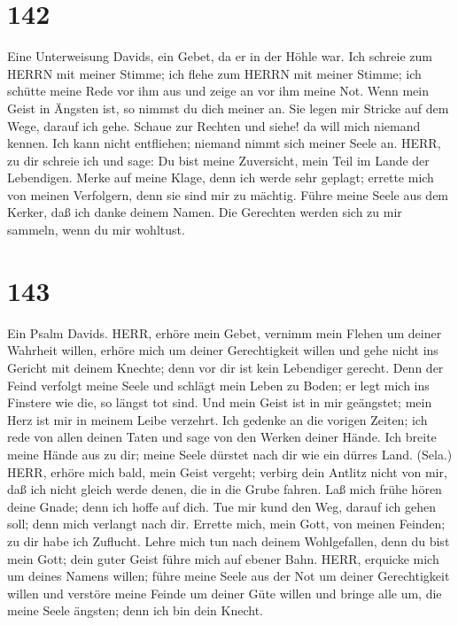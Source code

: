 \hypertarget{section-141}{%
\section{142}\label{section-141}}

 Eine Unterweisung Davids, ein Gebet, da er in der Höhle
war. Ich schreie zum HERRN mit meiner Stimme; ich flehe zum HERRN mit
meiner Stimme;  ich schütte meine Rede vor ihm aus und zeige
an vor ihm meine Not.  Wenn mein Geist in Ängsten ist, so
nimmst du dich meiner an. Sie legen mir Stricke auf dem Wege, darauf ich
gehe.  Schaue zur Rechten und siehe! da will mich niemand
kennen. Ich kann nicht entfliehen; niemand nimmt sich meiner Seele an.
 HERR, zu dir schreie ich und sage: Du bist meine
Zuversicht, mein Teil im Lande der Lebendigen.  Merke auf
meine Klage, denn ich werde sehr geplagt; errette mich von meinen
Verfolgern, denn sie sind mir zu mächtig.  Führe meine Seele
aus dem Kerker, daß ich danke deinem Namen. Die Gerechten werden sich zu
mir sammeln, wenn du mir wohltust.

\hypertarget{section-142}{%
\section{143}\label{section-142}}

 Ein Psalm Davids. HERR, erhöre mein Gebet, vernimm mein
Flehen um deiner Wahrheit willen, erhöre mich um deiner Gerechtigkeit
willen  und gehe nicht ins Gericht mit deinem Knechte; denn
vor dir ist kein Lebendiger gerecht.  Denn der Feind
verfolgt meine Seele und schlägt mein Leben zu Boden; er legt mich ins
Finstere wie die, so längst tot sind.  Und mein Geist ist in
mir geängstet; mein Herz ist mir in meinem Leibe verzehrt. 
Ich gedenke an die vorigen Zeiten; ich rede von allen deinen Taten und
sage von den Werken deiner Hände.  Ich breite meine Hände
aus zu dir; meine Seele dürstet nach dir wie ein dürres Land. (Sela.)
 HERR, erhöre mich bald, mein Geist vergeht; verbirg dein
Antlitz nicht von mir, daß ich nicht gleich werde denen, die in die
Grube fahren.  Laß mich frühe hören deine Gnade; denn ich
hoffe auf dich. Tue mir kund den Weg, darauf ich gehen soll; denn mich
verlangt nach dir.  Errette mich, mein Gott, von meinen
Feinden; zu dir habe ich Zuflucht.  Lehre mich tun nach
deinem Wohlgefallen, denn du bist mein Gott; dein guter Geist führe mich
auf ebener Bahn.  HERR, erquicke mich um deines Namens
willen; führe meine Seele aus der Not um deiner Gerechtigkeit willen
 und verstöre meine Feinde um deiner Güte willen und bringe
alle um, die meine Seele ängsten; denn ich bin dein Knecht.

